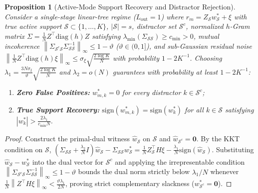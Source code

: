 \documentclass[11pt]{article}
\newtheorem{proposition}{Proposition}
\newcommand{\norm}[1]{\left\lVert #1 \right\rVert}
\newcommand{\abs}[1]{\left\lvert #1 \right\rvert}
\begin{document}
\begin{proposition}[Active-Mode Support Recovery and Distractor Rejection]
\label{prop:support}
Consider a single-stage linear-tree regime ($L_{\mathrm{out}}=1$) where $r_m = Z_{\mathcal{S}} w_{\mathcal{S}}^* + \xi$ with true active support $\mathcal{S} \subset \{1, \dots, K\}$, $\abs{\mathcal{S}} = s$, distractor set $\mathcal{S}^c$, normalized $h$-Gram matrix $\Sigma = \frac{1}{N} Z^\top \mathrm{diag}(h) Z$ satisfying $\lambda_{\min}(\Sigma_{\mathcal{S}\mathcal{S}}) \ge c_{\min} > 0$, mutual incoherence $\norm{\Sigma_{\mathcal{S}^c \mathcal{S}} \Sigma_{\mathcal{S}\mathcal{S}}^{-1}}_\infty \le 1 - \vartheta$ ($\vartheta \in (0,1]$), and sub-Gaussian residual noise $\norm{\frac{1}{N}Z^\top \mathrm{diag}(h)\xi}_\infty \le \sigma_\xi \sqrt{\frac{2\log K}{N}}$ with probability $1 - 2K^{-1}$. Choosing $\lambda_1 = \frac{3 N \sigma_\xi}{\vartheta}\sqrt{\frac{2\log K}{N}}$ and $\lambda_2 = o(N)$ guarantees with probability at least $1 - 2K^{-1}$:
\begin{enumerate}
    \item \textbf{Zero False Positives:} $w_{m,k}^* = 0$ for every distractor $k \in \mathcal{S}^c$;
    \item \textbf{True Support Recovery:} $\mathrm{sign}(w_{m,k}^*) = \mathrm{sign}(w_k^*)$ for all $k \in \mathcal{S}$ satisfying $\abs{w_k^*} > \frac{2\lambda_1}{c_{\min} N}$.
\end{enumerate}
\end{proposition}
\begin{proof}
Construct the primal-dual witness $\hat{w}_{\mathcal{S}}$ on $\mathcal{S}$ and $\hat{w}_{\mathcal{S}^c} = \mathbf{0}$. By the KKT condition on $\mathcal{S}$, $(\Sigma_{\mathcal{S}\mathcal{S}} + \frac{\lambda_2}{N}I)\hat{w}_{\mathcal{S}} - \Sigma_{\mathcal{S}\mathcal{S}} w_{\mathcal{S}}^* = \frac{1}{N} Z_{\mathcal{S}}^\top H \xi - \frac{\lambda_1}{N} \mathrm{sign}(\hat{w}_{\mathcal{S}})$. Substituting $\hat{w}_{\mathcal{S}} - w_{\mathcal{S}}^*$ into the dual vector for $\mathcal{S}^c$ and applying the irrepresentable condition $\norm{\Sigma_{\mathcal{S}^c \mathcal{S}}\Sigma_{\mathcal{S}\mathcal{S}}^{-1}}_\infty \le 1 - \vartheta$ bounds the dual norm strictly below $\lambda_1/N$ whenever $\frac{1}{N}\norm{Z^\top H \xi}_\infty < \frac{\vartheta \lambda_1}{2N}$, proving strict complementary slackness ($w_{\mathcal{S}^c}^* = \mathbf{0}$).
\end{proof}
\end{document}
